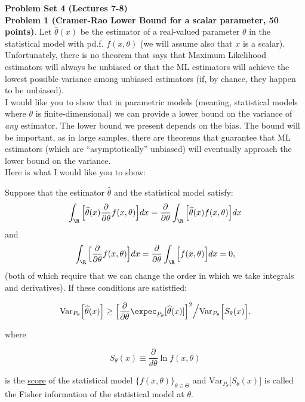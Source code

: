 \documentclass[11pt]{article} %
\begin{document}
\onehalfspace

\noindent \textbf{Problem Set 4 (Lectures 7-8)} \\

\noindent \textbf{Problem 1 (Cramer-Rao Lower Bound for a scalar parameter, 50 points)}. 
\noindent Let $\widehat{\theta}(x)$ be the estimator of a real-valued parameter $\theta$ in the statistical model with pd.f. $f(x,\theta)$ (we will assume also that $x$ is a scalar). Unfortunately, there is no theorem that says that Maximum Likelihood estimators will always be unbiased or that the ML estimators will achieve the lowest possible variance among unbiased estimators (if, by chance, they happen to be unbiased). \\

\noindent I would like you to show that in parametric models (meaning, statistical models where $\theta$ is finite-dimensional) we can provide a lower bound on the variance of \emph{any} estimator. The lower bound we present depends on the bias. The bound will be important, as in large samples, there are theorems that guarantee that ML estimators (which are ``asymptotically'' unbiased) will eventually approach the lower bound on the variance. \\

Here is what I would like you to show:

\begin{proposition}
Suppose that the estimator $\widehat{\theta}$ and the statistical model satisfy:
\begin{equation} \label{equation:regCR}
\int_{\R}\Big[ \widehat{\theta}(x) \frac{\partial}{\partial \theta}f(x,\theta) \Big] dx =  \frac{\partial}{\partial \theta} \int_{\R}\Big[ \widehat{\theta}(x) f(x,\theta) \Big] dx
\end{equation}
and 
\begin{equation}\label{equation:scoreCR}
\int_{\R} \Big[ \frac{\partial}{\partial \theta}f(x,\theta)  \Big] dx= \frac{\partial}{\partial \theta} \int_{\R} \Big[ f(x,\theta)  \Big] dx=0,
\end{equation}
\noindent (both of which require that we can change the order in which we take integrals and derivatives). If these conditions are satistfied:

$$\text{Var}_{P_\theta}\Big[ \widehat{\theta}(x)\Big] \geq \Big[ \frac{\partial}{\partial \theta} \expec_{P_\theta}[\widehat{\theta}(x)] \Big]^2 \Big/ \text{Var}_{P_\theta}\Big[S_{\theta}(x) \Big],$$

\noindent where

$$S_{\theta}(x) \equiv \frac{\partial}{d\theta} \ln f(x,\theta)$$

\noindent is the \underline{score} of the statistical model $\{f(x,\theta)\}_{\theta \in \Theta}$ and $\text{Var}_{P_\theta}\Big[S_{\theta}(x) \Big]$ is called the Fisher information of the statistical model at $\theta$. 


\end{proposition}
\end{document}
